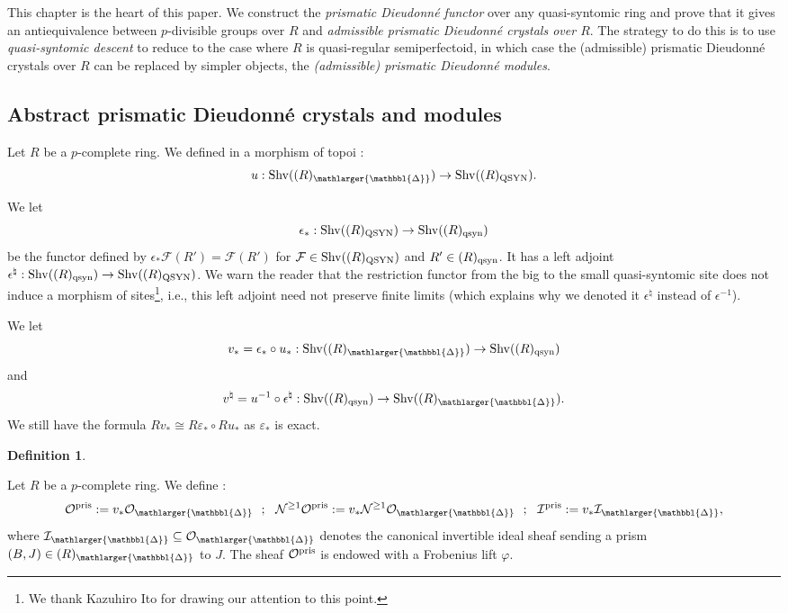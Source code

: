 \documentclass{amsart}
\newcommand{\prism}{{\mathlarger{\mathbbl{\Delta}}}}
\theoremstyle{plain}
\theoremstyle{definition}
\newtheorem{definition}[theorem]{Definition}
\newcommand{\purple}[1]{{\color{black} #1}}
\newcommand{\red}[1]{{\color{black} #1}}
\newcommand{\blue}[1]{{\color{black}#1}}
\begin{document}
This chapter is the heart of this paper. \purple{We construct the \textit{prismatic Dieudonn\'e functor} over any quasi-syntomic ring and prove that it gives an antiequivalence between $p$-divisible groups over $R$ and \textit{\red{admissible} prismatic Dieudonn\'e crystals over $R$}.} The strategy to do this is to use \textit{quasi-syntomic descent} to reduce to the case where $R$ is quasi-regular semiperfectoid, in which case the \red{(admissible)} prismatic Dieudonn\'e crystals over $R$ can be replaced by simpler objects, the \textit{\red{(admissible)} prismatic Dieudonn\'e modules}.


\subsection{Abstract prismatic Dieudonn\'e crystals and modules}
\label{sec:abstr-divid-dieud}
Let $R$ be a $p$-complete ring. We defined in  a morphism of topoi :
\[ u : \mathrm{Shv}((R)_{\prism}) \to \mathrm{Shv}((R)_{\rm QSYN}).   \]
\blue{We let 
$$
\epsilon_\ast: \mathrm{Shv}((R)_{\rm QSYN}) \to \mathrm{Shv}((R)_{\rm qsyn})
$$
be the functor defined by $\epsilon_\ast \mathcal{F}(R') = \mathcal{F}(R')$ for $\mathcal{F} \in \mathrm{Shv}((R)_{\rm QSYN})$ and $R' \in (R)_{\rm qsyn}$. It has a left adjoint $\epsilon^\natural: \mathrm{Shv}((R)_{\rm qsyn}) \to \mathrm{Shv}((R)_{\rm QSYN})$. We warn the reader that the restriction functor from the big to the small quasi-syntomic site does not induce a morphism of sites\footnote{We thank Kazuhiro Ito for drawing our attention to this point.}, i.e., this left adjoint need not preserve finite limits (which explains why we denoted it $\epsilon^\natural$ instead of $\epsilon^{-1}$). 

We let 
$$ v_\ast = \epsilon_\ast \circ u_\ast :  \mathrm{Shv}((R)_{\prism}) \to \mathrm{Shv}((R)_{\rm qsyn})
$$
and
$$
v^\natural = u^{-1} \circ \epsilon^\natural : \mathrm{Shv}((R)_{\rm qsyn}) \to  \mathrm{Shv}((R)_{\prism}).
$$
We still have the formula $Rv_\ast\cong R\varepsilon_\ast\circ Ru_\ast$ as $\varepsilon_\ast$ is exact.
}

\begin{definition}
 \label{sec:abstr-divid-prism-definition-of-the-sheaves}

Let $R$ be a $p$-complete ring. We define :
\[ \mathcal{O}^{\rm pris} := v_* \mathcal{O}_{\prism} ~~ ; ~~ \mathcal{N}^{\geq 1} \mathcal{O}^{\rm pris} := v_* \mathcal{N}^{\geq 1} \mathcal{O}_{\prism} ~~ ; ~~  \mathcal{I}^{\rm pris} := v_* \mathcal{I}_{\prism} , \]
where $\mathcal{I}_\prism\subseteq \mathcal{O}_{\prism}$ denotes the canonical invertible ideal sheaf sending a prism $(B,J)\in (R)_{\prism}$ to $J$.
The sheaf $\mathcal{O}^{\rm pris}$ is endowed with a Frobenius lift $\varphi$. 
\end{definition}
\end{document}
